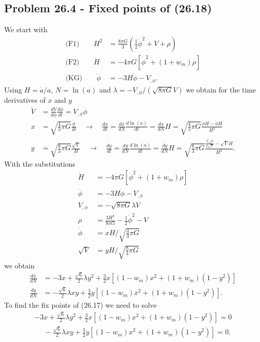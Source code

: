 \documentclass[10pt,a4paper]{book}
\theoremstyle{definition}
\begin{document}
\subsection{Problem 26.4 - Fixed points of (26.18)}
We start with
\begin{align}
    \text{(F1)}\qquad H^2&=\frac{8\pi G}{3}\left(\frac{1}{2}\dot{\phi}^2+V+\rho\right)\\
    \text{(F2)}\qquad \dot{H}&=-4\pi G\left[\dot{\phi}^2+(1+w_m)\rho\right]\\
    \text{(KG)}\qquad \ddot{\phi}&=-3H\dot{\phi}-V_{,\phi}.
\end{align}
Using $H=\dot{a}/a$, $N=\ln(a)$ and $\lambda=-V_{,\phi}/(\sqrt{8\pi G}V)$ we obtain for the time derivatives of $x$ and $y$
\begin{align}
    \dot{V}&=\frac{dV}{d\phi}\frac{d\phi}{dt}=V_{,\phi}\dot{\phi}\\
    x&=\sqrt{\frac{4}{3}\pi G}\frac{\dot{\phi}}{H}\quad\rightarrow\quad\frac{dx}{dt}=\frac{dx}{dN}\frac{d\ln(a)}{dt}
    =\frac{dx}{dN}H
    =\sqrt{\frac{4}{3}\pi G}\frac{\ddot{\phi}H-\dot{\phi}\dot{H}}{H^2}\\
    y&=\sqrt{\frac{8}{3}\pi G}\frac{\sqrt{V}}{H}\quad\rightarrow\quad\frac{dy}{dt}=\frac{dy}{dN}\frac{d\ln(a)}{dt}
    =\frac{dy}{dN}H
    =\sqrt{\frac{8}{3}\pi G}\frac{\frac{V_{,\phi}\dot{\phi}}{2\sqrt{V}}-\sqrt{V}\dot{H}}{H^2}.
\end{align}
With the substitutions
\begin{align}
    \dot{H}&=-4\pi G\left[\dot{\phi}^2+(1+w_m)\rho\right]\\
    \ddot{\phi}&=-3H\dot{\phi}-V_{,\phi}\\
    V_{,\phi}&=-\sqrt{8\pi G}\lambda V\\
    \rho&=\frac{3H^2}{8\pi G}-\frac{1}{2}\dot{\phi}^2-V\\
    \dot{\phi}&=xH/\sqrt{\frac{4}{3}\pi G}\\
    \sqrt{V}&=yH/\sqrt{\frac{8}{3}\pi G}
\end{align}
we obtain
\begin{align}
    \frac{dx}{dN}
    &=-3x+\frac{\sqrt{6}}{2}\lambda y^2+\frac{3}{2}x[(1-w_m)x^2+(1+w_m)(1-y^2)]\\
    \frac{dy}{dN}
    &=-\frac{\sqrt{6}}{2}\lambda xy+\frac{3}{2}y[(1-w_m)x^2+(1+w_m)(1-y^2)].
\end{align}
To find the fix points of (26.17) we need to solve
\begin{align}
    -3x+\frac{\sqrt{6}}{2}\lambda y^2+\frac{3}{2}x[(1-w_m)x^2+(1+w_m)(1-y^2)]=0\\
    \quad\,\,-\frac{\sqrt{6}}{2}\lambda xy+\frac{3}{2}y[(1-w_m)x^2+(1+w_m)(1-y^2)]=0.
\end{align}
\end{document}
